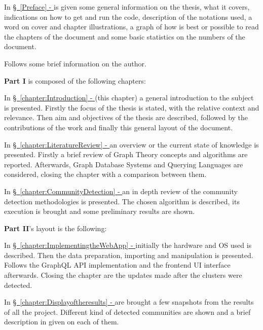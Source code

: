 In \hyperref[Preface]{\S\ \ref{Preface} - } is given some general information on the thesis, what it covers, indications on how to get and run the code, description of the notations used, a word on cover and chapter illustrations, a graph of how is best or possible to read the chapters of the document and some basic statistics on the numbers of the document.

Follows some brief information on the author.
\medskip

\textbf{Part I} is composed of the following chapters:

In \hyperref[chapter:Introduction]{\S\ \ref{chapter:Introduction} - } (this chapter) a general introduction to the subject is presented.
Firstly the focus of the thesis is stated, with the relative context and relevance.
Then aim and objectives of the thesis are described, followed by the contributions of the work and finally this general layout of the document.

In \hyperref[chapter:LiteratureReview]{\S\ \ref{chapter:LiteratureReview} - } an overview or the current state of knowledge is presented.
Firstly a brief review of Graph Theory concepts and algorithms are reported.
Afterwards, Graph Database Systems and Querying Languages are considered, closing the chapter with a comparison between them.

In \hyperref[chapter:CommunityDetection]{\S\ \ref{chapter:CommunityDetection} - } an in depth review of the community detection methodologies is presented. The chosen algorithm is described, its execution is brought and some preliminary results are shown.
\medskip

\textbf{Part II}'s layout is the following:

In \hyperref[chapter:ImplementingtheWebApp]{\S\ \ref{chapter:ImplementingtheWebApp} - } initially the hardware and OS used is described.
Then the data preparation, importing and manipulation is presented.
Follows the \gls{GraphQL} \acrshort{API} implementation and the frontend UI interface afterwards.
Closing the chapter are the updates made after the clusters were detected.

In \hyperref[chapter:Displayoftheresults]{\S\ \ref{chapter:Displayoftheresults} - } are brought a few snapshots from the results of all the project.
Different kind of detected communities are shown and a brief description in given on each of them.
\medskip

